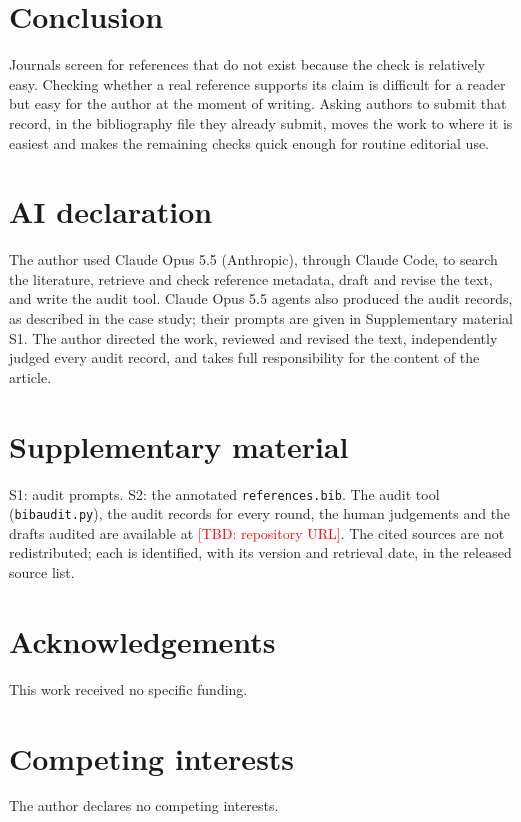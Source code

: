 \documentclass[11pt]{article}
\newcommand{\TBD}[1]{\textcolor{red}{[TBD: #1]}}
\begin{document}
\section{Conclusion}

Journals screen for references that do not exist because the check is relatively easy. Checking whether a real reference supports its claim is difficult for a reader but easy for the author at the moment of writing. Asking authors to submit that record, in the bibliography file they already submit, moves the work to where it is easiest and makes the remaining checks quick enough for routine editorial use.

\section*{AI declaration}

The author used Claude Opus 5.5 (Anthropic), through Claude Code, to search the literature, retrieve and check reference metadata, draft and revise the text, and write the audit tool. Claude Opus 5.5 agents also produced the audit records, as described in the case study; their prompts are given in Supplementary material S1. The author directed the work, reviewed and revised the text, independently judged every audit record, and takes full responsibility for the content of the article.

\section*{Supplementary material}

S1: audit prompts. S2: the annotated \texttt{references.bib}. The audit tool (\texttt{bibaudit.py}), the audit records for every round, the human judgements and the drafts audited are available at \TBD{repository URL}. The cited sources are not redistributed; each is identified, with its version and retrieval date, in the released source list.

\section*{Acknowledgements}

This work received no specific funding.

\section*{Competing interests}

The author declares no competing interests.



\end{document}

